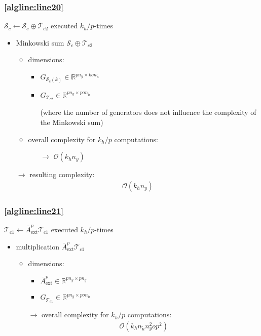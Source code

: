 \documentclass{article}
\begin{document}
\subsubsection{\cref{algline:line20}} 
$\mathcal{S}_c \gets \mathcal{S}_c \oplus \mathcal{T}_{c2}$ 
executed $k_h/p$-times
\begin{itemize}
    \item Minkowski sum $\mathcal{S}_c \oplus \mathcal{T}_{c2}$
    \begin{itemize}
        \item dimensions:
        \begin{itemize}
            \item $G_{\mathcal{S}_c(k)} \in \mathbb{R}^{pn_y \times k o n_{\tilde{u}}}$
            \item $G_{\mathcal{T}_{c2}} \in \mathbb{R}^{pn_y \times pon_{\tilde{u}}}$ 
            \item[] (where the number of generators does not influence the complexity of the Minkowski sum)
        \end{itemize}
        \item overall complexity for $k_h/p$ computations:
        \begin{itemize}
            \item[$\rightarrow$] $\mathcal{O}(k_h n_y)$
        \end{itemize}
    \end{itemize}    
    \item[$\rightarrow$] resulting complexity: \begin{align*}
        \mathcal{O}(k_h n_y)
    \end{align*}
\end{itemize}

\subsubsection{\cref{algline:line21}} 
$\mathcal{T}_{c1} \gets \bar{A}_\text{ext}^p \mathcal{T}_{c1}$ 
executed $k_h/p$-times
\begin{itemize}
    \item multiplication $\bar{A}_\text{ext}^{p} \mathcal{T}_{c1}$
    \begin{itemize}
        \item dimensions:
        \begin{itemize}
            \item $\bar{A}_\text{ext}^p \in \mathbb{R}^{pn_y \times pn_y}$
            \item $G_{\mathcal{T}_{c1}} \in \mathbb{R}^{pn_y \times p o n_{\tilde{u}}}$
        \end{itemize}
        \item[$\rightarrow$] overall complexity for $k_h/p$ computations:
        \begin{align*}
        \mathcal{O}(k_h n_{\tilde{u}} n_y^2 o p^2)
    \end{align*}
    \end{itemize}    
\end{itemize}
\end{document}
